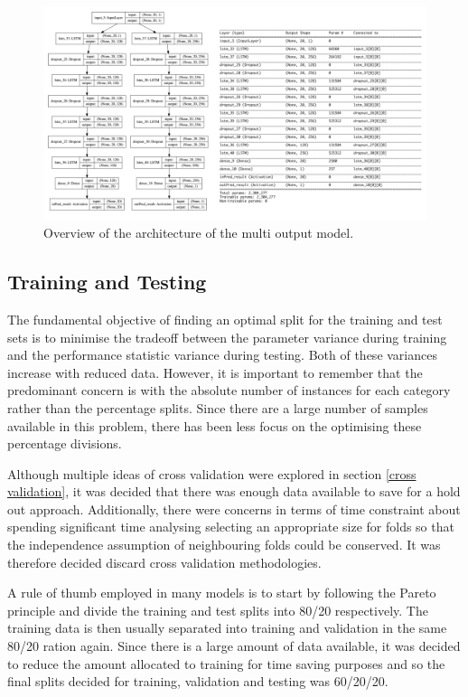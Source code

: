 \documentclass[10pt,onecolumn,letterpaper]{article}
\begin{document}
\begin{figure}[!htb]
\centering
\includegraphics[width=17.5cm]{multi_output.png}
\caption{Overview of the architecture of the multi output model.}
\end{figure}

\newpage

\subsection{Training and Testing} 

The fundamental objective of finding an optimal split for the training and test sets is to minimise the tradeoff between the parameter variance during training and the performance statistic variance during testing. Both of these variances increase with reduced data. However, it is important to remember that the predominant concern is with the absolute number of instances for each category rather than the percentage splits. Since there are a large number of samples available in this problem, there has been less focus on the optimising these percentage divisions. 

Although multiple ideas of cross validation were explored in section \ref{cross validation}, it was decided that there was enough data available to save for a hold out approach. Additionally, there were concerns in terms of time constraint about spending significant time analysing selecting an appropriate size for folds so that the independence assumption of neighbouring folds could be conserved. It was therefore decided discard cross validation methodologies.

A rule of thumb employed in many models is to start by following the Pareto principle and divide the training and test splits into 80/20 respectively. The training data is then usually separated into training and validation in the same 80/20 ration again. Since there is a large amount of data available, it was decided to reduce the amount allocated to training for time saving purposes and so the final splits decided for training, validation and testing was 60/20/20.
\end{document}
